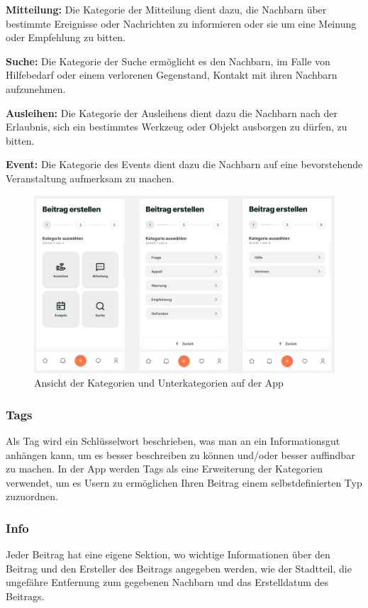 \textbf{Mitteilung:} Die Kategorie der Mitteilung dient dazu, die Nachbarn über bestimmte Ereignisse oder Nachrichten zu informieren oder sie um eine Meinung oder Empfehlung zu bitten.

\textbf{Suche:} Die Kategorie der Suche ermöglicht es den Nachbarn, im Falle von Hilfebedarf oder einem verlorenen Gegenstand, Kontakt mit ihren Nachbarn aufzunehmen.

\textbf{Ausleihen:} Die Kategorie der Ausleihens dient dazu die Nachbarn nach der Erlaubnis, sich ein bestimmtes Werkzeug oder Objekt ausborgen zu dürfen, zu bitten.

\textbf{Event:} Die Kategorie des Events dient dazu die Nachbarn auf eine bevorstehende Veranstaltung aufmerksam zu machen.

\begin{figure}[H]
  \centering
  \includegraphics[width=\textwidth]{pics/categories.JPG}
  \caption{Ansicht der Kategorien und Unterkategorien auf der App}
\end{figure}


\subsubsection{Tags}
Als Tag wird ein Schlüsselwort beschrieben, was man an ein Informationsgut anhängen kann, um es besser beschreiben zu können und/oder besser auffindbar zu machen. In der App werden Tags als eine Erweiterung der Kategorien verwendet, um es Usern zu ermöglichen Ihren Beitrag einem selbstdefinierten Typ zuzuordnen.

\subsubsection{Info}
Jeder Beitrag hat eine eigene Sektion, wo wichtige Informationen über den Beitrag und den Ersteller des Beitrags angegeben werden, wie der Stadtteil, die ungefähre Entfernung zum gegebenen Nachbarn und das Erstelldatum des Beitrags.

